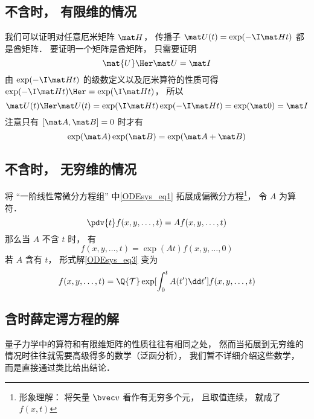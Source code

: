 

\subsection{不含时， 有限维的情况}
我们可以证明对任意厄米矩阵 $\mat H$， 传播子 $\mat U(t) = \exp(-\I \mat H t)$ 都是酋矩阵． 要证明一个矩阵是酋矩阵， 只需要证明
\begin{equation}
\mat{U}\Her \mat U = \mat I
\end{equation}
由 $\exp(-\I \mat H t)$ 的级数定义以及厄米算符的性质可得 $\exp(-\I \mat H t)\Her = \exp(\I \mat H t)$， 所以
\begin{equation}
\mat U(t)\Her \mat U(t) = \exp(\I \mat H t) \exp(-\I \mat H t) = \exp(\mat 0) = \mat I
\end{equation}
注意只有 $[\mat A, \mat B] = 0$ 时才有
\begin{equation}
\exp(\mat A)\exp(\mat B) = \exp(\mat A + \mat B)
\end{equation}

\subsection{不含时， 无穷维的情况}
将 “一阶线性常微分方程组” 中\autoref{ODEsys_eq1} 拓展成偏微分方程\footnote{形象理解： 将矢量 $\bvec v$ 看作有无穷多个元， 且取值连续， 就成了 $f(x, t)$}， 令 $A$ 为算符．
\begin{equation}
\pdv{t} f(x, y, \dots, t) = A f(x, y, \dots, t)
\end{equation}
那么当 $A$ 不含 $t$ 时， 有
\begin{equation}
f(x, y, \dots, t) = \exp(A t) f(x, y, \dots, 0)
\end{equation}
若 $A$ 含有 $t$， 形式解\autoref{ODEsys_eq3} 变为
\begin{equation}
f(x, y, \dots, t) = \Q {\mathcal T} \exp[\int_0^ t A(t')\dd t'] f(x, y, \dots, t)
\end{equation}

\subsection{含时薛定谔方程的解}

量子力学中的算符和有限维矩阵的性质往往有相同之处， 然而当拓展到无穷维的情况时往往就需要高级得多的数学（泛函分析）， 我们暂不详细介绍这些数学， 而是直接通过类比给出结论．

